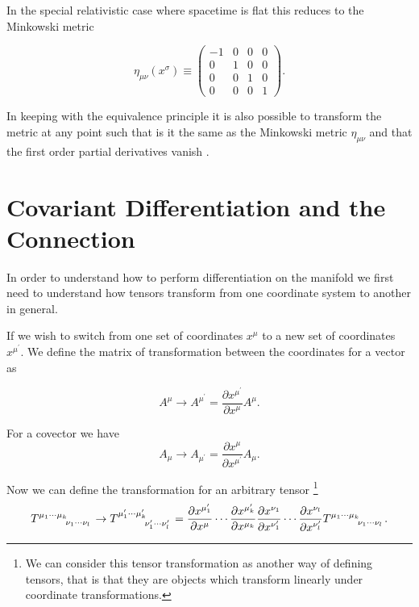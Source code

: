 \noindent In the special relativistic case where spacetime is flat this reduces to the Minkowski metric

\begin{equation} \label{metric-sr}
	\eta_{\mu \nu} (x^{\sigma}) \equiv
	\begin{pmatrix} 
	-1 & 0 & 0 & 0 \\
	0 & 1 & 0 & 0 \\
	0 & 0 & 1 & 0 \\
	0 & 0 & 0 & 1 
	\end{pmatrix} .
\end{equation}

In keeping with the equivalence principle it is also possible to transform the metric at any point such that is it the same as the Minkowski metric \(\eta_{\mu \nu}\) and that the first order partial derivatives vanish \cite{carroll}.

\section{Covariant Differentiation and the Connection}

In order to understand how to perform differentiation on the manifold we first need to understand how tensors transform from one coordinate system to another in general.

\noindent If we wish to switch from one set of coordinates $x^{\mu}$ to a new set of coordinates $x^{\mu^\prime}$. We define the matrix of transformation between the coordinates for a vector as \cite{cheng}

\begin{equation} \label{vector-transform}
	A^{\mu} \rightarrow A^{\mu^\prime} = \frac{\partial x^{\mu^\prime}}{\partial x^{\mu}} A^{\mu} .
\end{equation}

For a covector we have \cite{cheng}
\begin{equation} \label{covector-transform}
	A_{\mu} \rightarrow A_{\mu^\prime} = \frac{\partial x^{\mu}}{\partial x^{\mu^\prime}} A_{\mu} .
\end{equation}

Now we can define the transformation for an arbitrary tensor \footnote{We can consider this tensor transformation as another way of defining tensors, that is that they are objects which transform linearly under coordinate transformations.} \cite{carroll}
\begin{equation} \label{tensor-transform}
	T\indices{^{\mu_1}^{\cdots}^{\mu_k}_{\nu_1}_{\cdots}_{\nu_l}} \rightarrow T\indices{^{\mu_1^\prime}^{\cdots}^{\mu_k^\prime}_{\nu_1^\prime}_{\cdots}_{\nu_l^\prime}}
	= \frac{\partial x^{\mu_1^\prime}}{\partial x^{\mu}} \cdots \frac{\partial x^{\mu_k^\prime}}{\partial x^{\mu_k}} \frac{\partial x^{\nu_1}}{\partial x^{\nu_1^\prime}} \cdots 
	\frac{\partial x^{\nu_l}}{\partial x^{\nu_l^\prime}}
	T\indices{^{\mu_1}^{\cdots}^{\mu_k}_{\nu_1}_{\cdots}_{\nu_l}} .
\end{equation}

